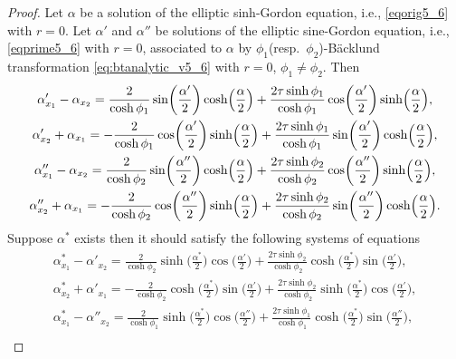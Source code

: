 \documentclass[pdftex]{sigma}
\numberwithin{equation}{section}
\begin{document}
\begin{proof} Let $\alpha$ be a solution of the elliptic sinh-Gordon equation, i.e., \eqref{eqorig5_6} with $r=0$.
Let $\alpha'$ and $\alpha''$ be solutions of the elliptic sine-Gordon equation, i.e., \eqref{eqprime5_6} with $r=0$, associated to $\alpha$
by $\phi_1$(resp.\ $\phi_2$)-B\"acklund transformation \eqref{eq:btanalytic_v5_6} with $r=0$, $\phi_1\neq \phi_2$. Then
 \begin{gather}
\alpha'_{x_1}-\alpha_{x_2}=\frac{2}{\cosh\phi_1}\sin \biggl(\frac{\alpha'}{2}\biggr)\cosh \Bigl(\frac{\alpha}{2}\Bigr)+\frac{2\tau\sinh\phi_1}{\cosh\phi_1} \cos\biggl(\frac{\alpha'}{2}\biggr)\sinh \Bigl(\frac{\alpha}{2}\Bigr),\nonumber\\
\alpha'_{x_2}+\alpha_{x_1}=-\frac{2}{\cosh\phi_1}\cos\biggl(\frac{\alpha'}{2}\biggr)\sinh\Bigl(\frac{\alpha}{2}\Bigr)+\frac{2\tau\sinh\phi_1}{\cosh\phi_1} \sin\biggl(\frac{\alpha'}{2}\biggr)\cosh\Bigl(\frac{\alpha}{2}\Bigr),\label{BTcase51}\\
\alpha''_{x_1}-\alpha_{x_2}=\frac{2}{\cosh\phi_2}\sin\biggl(\frac{\alpha''}{2}\biggr)\cosh \Bigl(\frac{\alpha}{2}\Bigr)+\frac{2\tau\sinh\phi_2}{\cosh\phi_2} \cos\biggl(\frac{\alpha''}{2}\biggr)\sinh\Bigl(\frac{\alpha}{2}\Bigr),\nonumber\\
\alpha''_{x_2}+\alpha_{x_1}=-\frac{2}{\cosh\phi_2}\cos\biggl(\frac{\alpha''}{2}\biggr)\sinh\Bigl(\frac{\alpha}{2}\Bigr)+\frac{2\tau\sinh\phi_2}{\cosh\phi_2} \sin\biggl(\frac{\alpha''}{2}\biggr)\cosh\Bigl(\frac{\alpha}{2}\Bigr).\label{BTcase52}
\end{gather}
Suppose $\alpha^*$ exists then it should satisfy the following
systems of equations
\begin{gather}
\alpha^*_{x_1}-\alpha'_{x_2}=\frac{2}{\cosh\phi_2}\sinh\biggl(\frac{\alpha^*}{2}\biggr)\cos\biggl(\frac{\alpha'}{2}\biggr)+\frac{2\tau\sinh\phi_2}{\cosh\phi_2} \cosh\biggl(\frac{\alpha^*}{2}\biggr)\sin\biggl(\frac{\alpha'}{2}\biggr),\nonumber\\
\alpha^*_{x_2}+\alpha'_{x_1}=-\frac{2}{\cosh\phi_ 2}\cosh\biggl(\frac{\alpha^*}{2}\biggr)\sin\biggl(\frac{\alpha'}{2}\biggr)+\frac{2\tau\sinh\phi_2}{\cosh\phi_2} \sinh\biggl(\frac{\alpha^*}{2}\biggr)\cos\biggl(\frac{\alpha'}{2}\biggr),\label{BTcase62}
\\
\alpha^*_{x_1}-\alpha''_{x_2}=\frac{2}{\cosh\phi_1}\sinh\biggl(\frac{\alpha^*}{2}\biggr)\cos\biggl(\frac{\alpha''}{2}\biggr)+\frac{2\tau\sinh\phi_1}{\cosh\phi_1} \cosh\biggl(\frac{\alpha^*}{2}\biggr)\sin\biggl(\frac{\alpha''}{2}\biggr),\nonumber\\

\end{gather}
\end{proof}
\end{document}
